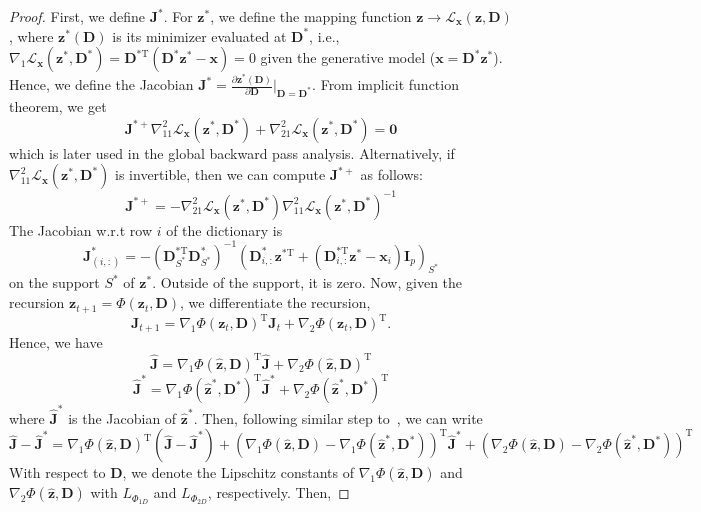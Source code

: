 \documentclass[10pt]{article} %
\newcommand{\D}{{\bm D}}
\newcommand{\J}{{\bm J}}
\newcommand{\x}{{\bm x}}
\newcommand{\z}{{\bm z}}
\newcommand{\zero}{{\bm 0}}
\newcommand{\Loss}{\mathcal{L}}
\begin{document}
\begin{proof}
First, we define $\J^{\ast}$. For $\z^{\ast}$, we define the mapping function $\z \rightarrow \Loss_{\x}(\z, \D)$, where $\z^{\ast}(\D)$ is its minimizer evaluated at $\D^{\ast}$, i.e., $\nabla_{1} \Loss_{\x}(\z^{\ast}, \D^{\ast}) = \D^{\ast\text{T}} ({\bm D}^{\ast} \z^{\ast} - \x) = 0$ given the generative model ($\x = \D^{\ast} \z^{\ast}$). Hence, we define the Jacobian $\J^{\ast} = \frac{\partial \z^{\ast}(\D)}{\partial \D}\rvert_{\D = \D^{\ast}}$. From implicit function theorem, we get
$$\J^{\ast+}  \nabla_{11}^2 \Loss_{\x}(\z^{\ast}, \D^{\ast}) + \nabla_{21}^2 \Loss_{\x}(\z^{\ast}, \D^{\ast}) = \zero$$
which is later used in the global backward pass analysis. Alternatively, if $\nabla_{11}^2 \Loss_{\x}(\z^{\ast}, \D^{\ast})$ is invertible, then we can compute $\J^{\ast+}$ as follows:
$$\J^{\ast+} = - \nabla_{21}^2 \Loss_{\x}(\z^{\ast}, \D^{\ast}) \nabla_{11}^2 \Loss_{\x}(\z^{\ast}, \D^{\ast})^{-1}$$
The Jacobian w.r.t row $i$ of the dictionary is
$$
\J^{\ast}_{(i,:)} = - (\D^{\ast\text{T}}_{S^{\ast}} \D^{\ast }_{S^{\ast}})^{-1} (\D^{\ast}_{i, :} \z^{\ast\text{T}} + (\D^{\ast \text{T}}_{i, :} \z^{\ast} - \x_i) {\bm I}_p)_{S^{\ast}}
$$
on the support $S^{\ast}$ of $\z^{\ast}$. Outside of the support, it is zero. Now, given the recursion $\z_{t+1} = \Phi(\z_t, \D)$, we differentiate the recursion,
\begin{equation*}
\J_{t+1} = \nabla_1 \Phi(\z_t, \D)^{\text{T}} \J_t + \nabla_2 \Phi(\z_t, \D)^{\text{T}}.
\end{equation*}
Hence, we have
\begin{equation*}
\hat \J = \nabla_1 \Phi(\hat \z, \D)^{\text{T}} \hat \J + \nabla_2 \Phi(\hat \z, \D)^{\text{T}}
\end{equation*}
\begin{equation*}
\hat \J^{\ast} = \nabla_1 \Phi(\hat \z^{\ast}, \D^{\ast})^{\text{T}} \hat \J^{\ast} + \nabla_2 \Phi(\hat \z^{\ast}, \D^{\ast})^{\text{T}}
\end{equation*}
where ${\hat \J^{\ast}}$ is the Jacobian of $\hat \z^{\ast}$. Then, following similar step to~, we can write
\begin{equation*}
\hat \J - \hat \J^{\ast} =  \nabla_1 \Phi(\hat \z, \D)^{\text{T}} (\hat \J - \hat \J^{\ast}) + (\nabla_1 \Phi(\hat \z, \D) - \nabla_1 \Phi(\hat \z^{\ast}, \D^{\ast}))^{\text{T}} \hat \J^{\ast} +  (\nabla_2 \Phi(\hat \z, \D) - \nabla_2 \Phi(\hat \z^{\ast}, \D^{\ast}))^{\text{T}}
\end{equation*}
With respect to $\D$, we denote the Lipschitz constants of $\nabla_1 \Phi(\hat \z, \D)$ and $\nabla_2 \Phi(\hat \z, \D)$ with $L_{\Phi_{1D}}$ and $L_{\Phi_{2D}}$, respectively. Then,

\end{proof}
\end{document}
